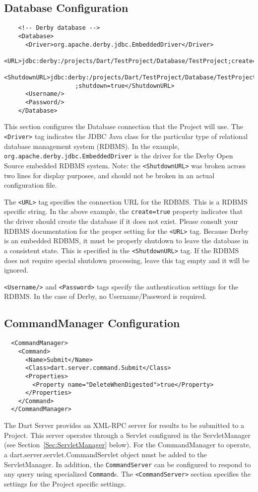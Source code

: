 \documentclass{InsightBook}
\newcommand{\xmltag}[1]{\texttt{<#1>}}
\begin{document}
\subsection{Database Configuration}
\begin{verbatim}
    <!-- Derby database -->
    <Database>
      <Driver>org.apache.derby.jdbc.EmbeddedDriver</Driver>
      <URL>jdbc:derby:/projects/Dart/TestProject/Database/TestProject;create=true</URL>
      <ShutdownURL>jdbc:derby:/projects/Dart/TestProject/Database/TestProject
                    ;shutdown=true</ShutdownURL>
      <Username/>
      <Password/>
    </Database>
\end{verbatim}
This section configures the Database connection that the Project will
use.  The \xmltag{Driver} tag indicates the JDBC Java class for the
particular type of relational database management system (RDBMS).  In
the example, \texttt{org.apache.derby.jdbc.EmbeddedDriver} is the
driver for the Derby Open Source embedded RDBMS system.  Note: the
\xmltag{ShutdownURL} was broken across two lines for display
purposes, and should not be broken in an actual configuration file.

The \xmltag{URL} tag specifies the connection URL for the RDBMS.
This is a RDBMS specific string.  In the above example, the
\texttt{create=true} property indicates that the driver should create
the database if it does not exist.  Please consult your RDBMS
documentation for the proper setting for the \xmltag{URL} tag.
Because Derby is an embedded RDBMS, it must be properly shutdown to
leave the database in a consistent state.  This is specified in the
\xmltag{ShutdownURL} tag.  If the RDBMS does not require special
shutdown processing, leave this tag empty and it will be ignored.

\xmltag{Username/} and \xmltag{Password} tags specify the
authentication settings for the RDBMS.  In the case of Derby, no
Username/Password is required.

\subsection{CommandManager Configuration}
\begin{verbatim}
  <CommandManager>
    <Command>
      <Name>Submit</Name>
      <Class>dart.server.command.Submit</Class>
      <Properties>
        <Property name="DeleteWhenDigested">true</Property>
      </Properties>
    </Command>
  </CommandManager>
\end{verbatim}
The Dart Server provides an XML-RPC server for results to be
submitted to a Project.  This server operates through a Servlet
configured in the ServletManager (see
Section~\ref{Sec:ServletManager} below).  For the CommandManager to
operate, a dart.server.servlet.CommandServlet object must be added to
the ServletManager.  In addition, the \texttt{CommandServer} can
be configured to respond to any query using specialized
\texttt{Command}s.  The \xmltag{CommandServer} section specifies
the settings for the Project specific settings.
\end{document}

